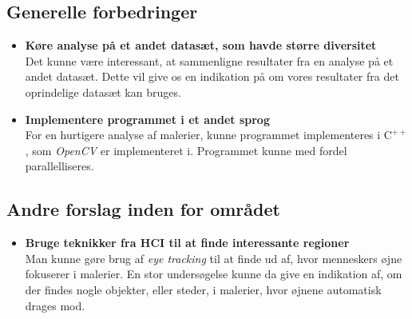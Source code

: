 {\subsection{Generelle forbedringer}
\begin{itemize}
    \item \textbf{Køre analyse på et andet datasæt, som havde større diversitet}\\
        Det kunne være interessant, at sammenligne resultater fra en
        analyse på et andet datasæt. Dette vil give os en indikation på
        om vores resultater fra det oprindelige datasæt kan bruges.
    \item \textbf{Implementere programmet i et andet sprog}\\
        For en hurtigere analyse af malerier, kunne programmet
        implementeres i $\textrm{C}^{++}$, som \emph{OpenCV} er
        implementeret i. Programmet kunne med fordel parallelliseres.
\end{itemize}

\subsection{Andre forslag inden for området}
\begin{itemize}
    \item \textbf{Bruge teknikker fra HCI til at finde interessante regioner}\\
        Man kunne gøre brug af \emph{eye tracking} til at finde ud af,
        hvor menneskers øjne fokuserer i malerier. En stor undersøgelse
        kunne da give en indikation af, om der findes nogle objekter,
        eller steder, i malerier, hvor øjnene automatisk drages mod.
\end{itemize}

}

